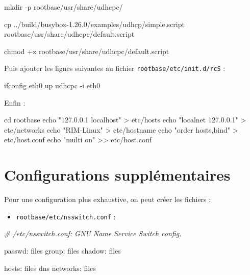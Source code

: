 \documentclass[]{article}
\newenvironment{Shaded}{}{}
\newcommand{\StringTok}[1]{\textcolor[rgb]{0.25,0.44,0.63}{{#1}}}
\newcommand{\CommentTok}[1]{\textcolor[rgb]{0.38,0.63,0.69}{\textit{{#1}}}}
\newcommand{\FunctionTok}[1]{\textcolor[rgb]{0.02,0.16,0.49}{{#1}}}
\newcommand{\OperatorTok}[1]{\textcolor[rgb]{0.40,0.40,0.40}{{#1}}}
\newcommand{\BuiltInTok}[1]{{#1}}
\newcommand{\ExtensionTok}[1]{{#1}}
\newcommand{\NormalTok}[1]{{#1}}
\providecommand{\tightlist}{%
  \setlength{\itemsep}{0pt}\setlength{\parskip}{0pt}}
\begin{document}
\begin{Shaded}
\begin{Highlighting}[]
\FunctionTok{mkdir} \NormalTok{-p rootbase/usr/share/udhcpc/}

\FunctionTok{cp} \NormalTok{../build/busybox-1.26.0/examples/udhcp/simple.script rootbase/usr/share/udhcpc/default.script}

\FunctionTok{chmod} \NormalTok{+x rootbase/usr/share/udhcpc/default.script}
\end{Highlighting}
\end{Shaded}

Puis ajouter les lignes suivantes au fichier
\texttt{rootbase/etc/init.d/rcS} :

\begin{Shaded}
\begin{Highlighting}[]
\ExtensionTok{ifconfig} \NormalTok{eth0 up}
\ExtensionTok{udhcpc} \NormalTok{-i eth0}
\end{Highlighting}
\end{Shaded}

Enfin :

\begin{Shaded}
\begin{Highlighting}[]
\BuiltInTok{cd} \NormalTok{rootbase}
\BuiltInTok{echo} \StringTok{"127.0.0.1      localhost"} \OperatorTok{>} \NormalTok{etc/hosts}
\BuiltInTok{echo} \StringTok{"localnet    127.0.0.1"} \OperatorTok{>} \NormalTok{etc/networks}
\BuiltInTok{echo} \StringTok{"RIM-Linux"} \OperatorTok{>} \NormalTok{etc/hostname}
\BuiltInTok{echo} \StringTok{"order hosts,bind"} \OperatorTok{>} \NormalTok{etc/host.conf}
\BuiltInTok{echo} \StringTok{"multi on"} \OperatorTok{>>} \NormalTok{etc/host.conf}
\end{Highlighting}
\end{Shaded}

\section{Configurations
supplémentaires}\label{configurations-suppluxe9mentaires}

Pour une configuration plus exhaustive, on peut créer les fichiers :

\begin{itemize}
\tightlist
\item
  \texttt{rootbase/etc/nsswitch.conf} :
\end{itemize}

\begin{Shaded}
\begin{Highlighting}[]
\CommentTok{# /etc/nsswitch.conf: GNU Name Service Switch config.}

\ExtensionTok{passwd}\NormalTok{:     files}
\ExtensionTok{group}\NormalTok{:      files}
\ExtensionTok{shadow}\NormalTok{:     files}

\ExtensionTok{hosts}\NormalTok{:      files dns}
\ExtensionTok{networks}\NormalTok{:   files}
\end{Highlighting}
\end{Shaded}
\end{document}

